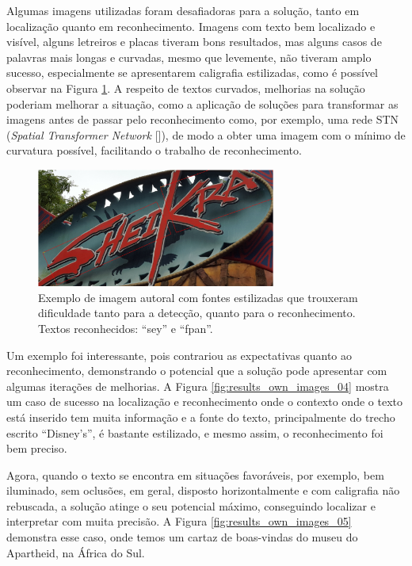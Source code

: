Algumas imagens utilizadas foram desafiadoras para a solução, tanto em localização quanto em reconhecimento. Imagens 
com texto bem localizado e visível, alguns letreiros e placas tiveram bons resultados, mas alguns casos de palavras mais longas 
e curvadas, mesmo que levemente, não tiveram amplo sucesso, especialmente se apresentarem caligrafia estilizadas, como é 
possível observar na Figura \ref{fig:results_own_images_03}. A respeito de textos curvados, melhorias na solução poderiam 
melhorar a situação, como a aplicação de soluções para transformar as imagens antes de passar pelo reconhecimento como, por 
exemplo, uma rede STN (\textit{Spatial Transformer Network} []), de modo a obter uma imagem com o mínimo de 
curvatura possível, facilitando o trabalho de reconhecimento.

\begin{figure}
    \centering
    \includegraphics[width=0.7\textwidth]{figs/resultados-autoral-03.png}
    \caption{Exemplo de imagem autoral com fontes estilizadas que trouxeram dificuldade tanto para a detecção, quanto 
    para o reconhecimento. Textos reconhecidos: “sey” e “fpan”.}
    \label{fig:results_own_images_03}
\end{figure}


Um exemplo foi interessante, pois contrariou as expectativas quanto ao reconhecimento, demonstrando o potencial que a 
solução pode apresentar com algumas iterações de melhorias. A Figura \ref{fig:results_own_images_04} mostra um caso de sucesso 
na localização e reconhecimento onde o contexto onde o texto está inserido tem muita informação e a fonte do texto, 
principalmente do trecho escrito “Disney’s”, é bastante estilizado, e mesmo assim, o reconhecimento foi bem preciso.


Agora, quando o texto se encontra em situações favoráveis, por exemplo, bem iluminado, sem oclusões, em geral, disposto 
horizontalmente e com caligrafia não rebuscada, a solução atinge o seu potencial máximo, conseguindo localizar e interpretar 
com muita precisão. A Figura \ref{fig:results_own_images_05} demonstra esse caso, onde temos um cartaz de boas-vindas do 
museu do Apartheid, na África do Sul.

